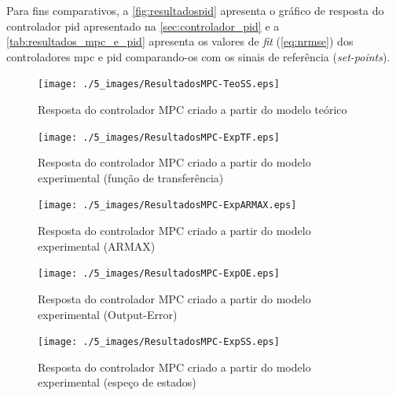 Para fins comparativos, a \cref{fig:resultadospid} apresenta o gráfico de resposta do controlador
\acrshort{pid} apresentado na \cref{sec:controlador_pid} e a \cref{tab:resultados_mpc_e_pid}
apresenta os valores de \textit{fit} (\cref{eq:nrmse}) dos controladores \acrshort{mpc} e \acrshort{pid} 
comparando-os com os sinais de referência (\textit{set-points}).

\begin{figure}[!h]
	\caption{Resposta do controlador MPC criado a partir do modelo teórico}
	\begin{center}
		\texttt{[image: ./5\_images/ResultadosMPC-TeoSS.eps]} 
		\label{fig:resultadosmpc-teoss}
	\end{center}
	\centering
\end{figure}

\begin{figure}[!h]
	\caption{Resposta do controlador MPC criado a partir do modelo experimental (função de transferência)}
	\begin{center}
		\texttt{[image: ./5\_images/ResultadosMPC-ExpTF.eps]} 
		\label{fig:resultadosmpc-exptf}
	\end{center}
	\centering
\end{figure}

\begin{figure}[!h]
	\caption{Resposta do controlador MPC criado a partir do modelo experimental (ARMAX)}
	\begin{center}
		\texttt{[image: ./5\_images/ResultadosMPC-ExpARMAX.eps]} 
		\label{fig:resultadosmpc-exparmax}
	\end{center}
	\centering
\end{figure}

\begin{figure}[!h]
	\caption{Resposta do controlador MPC criado a partir do modelo experimental (Output-Error)}
	\begin{center}
		\texttt{[image: ./5\_images/ResultadosMPC-ExpOE.eps]} 
		\label{fig:resultadosmpc-expoe}
	\end{center}
	\centering
\end{figure}

\begin{figure}[!h]
	\caption{Resposta do controlador MPC criado a partir do modelo experimental (espeço de estados)}
	\begin{center}
		\texttt{[image: ./5\_images/ResultadosMPC-ExpSS.eps]} 
		\label{fig:resultadosmpc-expss}
	\end{center}
	\centering
\end{figure}


